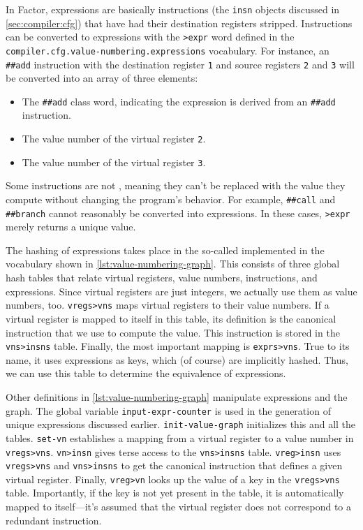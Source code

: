 \begin{sloppypar}
In Factor, expressions are basically instructions (the \Verb|insn| objects
discussed in \cref{sec:compiler:cfg}) that have had their destination registers
stripped.  Instructions can be converted to expressions with the \Verb|>expr|
word defined in the \Verb|compiler.cfg.value-numbering.expressions|
vocabulary.  For instance, an \Verb|##add| instruction with the destination
register \Verb|1| and source registers \Verb|2| and \Verb|3| will be
converted into an array of three elements:
%
\begin{itemize}
%
  \item The \Verb|##add| class word, indicating the expression is derived
        from an \Verb|##add| instruction.
%
  \item The value number of the virtual register \Verb|2|.
%
  \item The value number of the virtual register \Verb|3|.
%
\end{itemize}
%
\noindent Some instructions are not , meaning
they can't be replaced with the value they compute without changing the
program's behavior.  For example, \Verb|##call| and \Verb|##branch| cannot
reasonably be converted into expressions.  In these cases, \Verb|>expr|
merely returns a unique value.
\end{sloppypar}


The hashing of expressions takes place in the so-called 
implemented in the vocabulary shown in \vref{lst:value-numbering-graph}.  This
consists of three global hash tables that relate virtual registers, value
numbers, instructions, and expressions.  Since virtual registers are just
integers, we actually use them as value numbers, too.  \Verb|vregs>vns| maps
virtual registers to their value numbers.  If a virtual register  is mapped to
itself in this table, its definition is the canonical instruction that we use
to compute the value.  This instruction is stored in the \Verb|vns>insns|
table.  Finally, the most important mapping is \Verb|exprs>vns|.  True to its
name, it uses expressions as keys, which (of course) are implicitly hashed.
Thus, we can use this table to determine the equivalence of expressions.

Other definitions in \vref{lst:value-numbering-graph} manipulate expressions
and the graph.  The global variable \Verb|input-expr-counter| is used in the
generation of unique expressions discussed earlier.  \Verb|init-value-graph|
initializes this and all the tables.  \Verb|set-vn| establishes a mapping
from a virtual register to a value number in \Verb|vregs>vns|.
\Verb|vn>insn| gives terse access to the \Verb|vns>insns| table.
\Verb|vreg>insn| uses \Verb|vregs>vns| and \Verb|vns>insns| to get the
canonical instruction that defines a given virtual register.  Finally,
\Verb|vreg>vn| looks up the value of a key in the \Verb|vregs>vns| table.
Importantly, if the key is not yet present in the table, it is automatically
mapped to itself---it's assumed that the virtual register does not correspond
to a redundant instruction.

